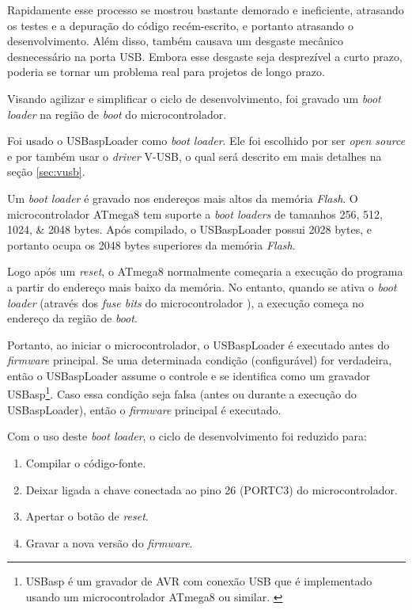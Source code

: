 \documentclass[brazil,pagestart=firstchapter]{abnt}
\newcommand*{\VUSB}{\mbox{V-USB}\xspace}
\begin{document}
Rapidamente esse processo se mostrou bastante demorado e ineficiente,
atrasando os testes e a depuração do código recém-escrito, e portanto
atrasando o desenvolvimento. Além disso, também causava um desgaste mecânico
desnecessário na porta \ac{USB}. Embora esse desgaste seja desprezível a
curto prazo, poderia se tornar um problema real para projetos de longo
prazo.

Visando agilizar e simplificar o ciclo de desenvolvimento, foi gravado um
\textit{boot loader} na região de \textit{boot} do microcontrolador.

Foi usado o USBaspLoader \cite{USBaspLoader} como \textit{boot loader}. Ele
foi escolhido por ser \textit{open source} e por também usar o
\textit{driver} \VUSB, o qual será descrito em mais detalhes na seção
\ref{sec:vusb}.

Um \textit{boot loader} é gravado nos endereços mais altos da memória
\textit{Flash}. O microcontrolador ATmega8 tem suporte a \textit{boot
loaders} de tamanhos \numlist{256;512;1024;2048} bytes.
\cite[p.~213]{ATmega8} Após compilado, o USBaspLoader possui \num{2028}
bytes, e portanto ocupa os \num{2048} bytes superiores da memória
\textit{Flash}.

Logo após um \textit{reset}, o ATmega8 normalmente começaria a execução do
programa a partir do endereço mais baixo da memória. No entanto, quando se
ativa o \textit{boot loader} (através dos \textit{fuse bits} do
microcontrolador \cite[p.~216]{ATmega8}), a execução começa no endereço da
região de \textit{boot}.

Portanto, ao iniciar o microcontrolador, o USBaspLoader é executado antes do
\textit{firmware} principal. Se uma determinada condição (configurável) for
verdadeira, então o USBaspLoader assume o controle e se identifica como um
gravador USBasp\footnote{
	USBasp é um gravador de AVR com conexão USB que é implementado usando um
	microcontrolador ATmega8 ou similar. \cite{USBasp}
}.
Caso essa condição seja falsa (antes ou durante a execução do USBaspLoader),
então o \textit{firmware} principal é executado.

Com o uso deste \textit{boot loader}, o ciclo de desenvolvimento foi
reduzido para:

\begin{enumerate}
\item Compilar o código-fonte.
\item Deixar ligada a chave conectada ao pino 26 (PORTC3) do
microcontrolador.
\item Apertar o botão de \textit{reset}.
\item Gravar a nova versão do \textit{firmware}.
\end{enumerate}
\end{document}
